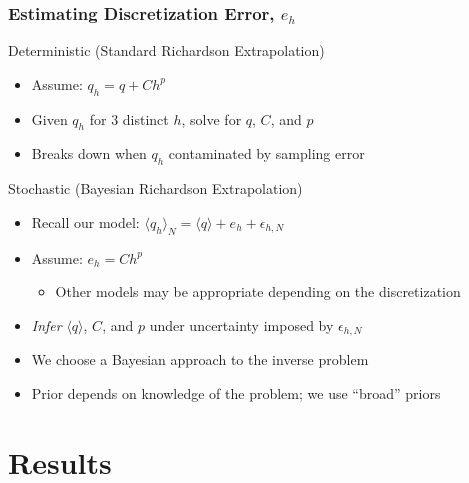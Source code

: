 \documentclass[mathserif]{beamer}
\newcommand{\avg}[1]{\langle #1 \rangle} %
\begin{document}
\begin{frame}
\frametitle{Estimating Discretization Error, $e_h$}

\begin{block}{Deterministic (Standard Richardson Extrapolation)}
\begin{itemize}
\item Assume: $q_h = q + C h^p$
\item Given $q_h$ for 3 distinct $h$, solve for $q$, $C$, and $p$
\item Breaks down when $q_h$ contaminated by sampling error
\end{itemize}
\end{block}

\begin{block}{Stochastic (Bayesian Richardson Extrapolation)}
\begin{itemize}
\item Recall our model: $\langle q_h \rangle_{N} = \langle q \rangle + e_h + \epsilon_{h,N}$
\item Assume: $e_h = C h^p$
  \begin{itemize}
  \item Other models may be appropriate depending on the discretization
  \end{itemize}
 \item \emph{Infer} $\langle q \rangle$, $C$, and $p$ under uncertainty imposed by
      $\epsilon_{h,N}$
 \item We choose a Bayesian approach to the inverse problem
 \item Prior depends on knowledge of the problem; we use ``broad'' priors
\end{itemize}
\end{block}

\end{frame}

\section{Results}
\end{document}
